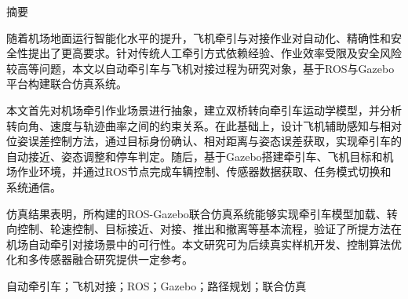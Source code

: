 
\begin{center}
{\heiti{} 摘\quad 要}
\end{center}

随着机场地面运行智能化水平的提升，飞机牵引与对接作业对自动化、精确性和安全性提出了更高要求。针对传统人工牵引方式依赖经验、作业效率受限及安全风险较高等问题，本文以自动牵引车与飞机对接过程为研究对象，基于ROS与Gazebo平台构建联合仿真系统。

本文首先对机场牵引作业场景进行抽象，建立双桥转向牵引车运动学模型，并分析转向角、速度与轨迹曲率之间的约束关系。在此基础上，设计飞机辅助感知与相对位姿误差控制方法，通过目标身份确认、相对距离与姿态误差获取，实现牵引车的自动接近、姿态调整和停车判定。随后，基于Gazebo搭建牵引车、飞机目标和机场作业环境，并通过ROS节点完成车辆控制、传感器数据获取、任务模式切换和系统通信。

仿真结果表明，所构建的ROS-Gazebo联合仿真系统能够实现牵引车模型加载、转向控制、轮速控制、目标接近、对接、推出和撤离等基本流程，验证了所提方法在机场自动牵引对接场景中的可行性。本文研究可为后续真实样机开发、控制算法优化和多传感器融合研究提供一定参考。

\vspace{1em}
 自动牵引车；飞机对接；ROS；Gazebo；路径规划；联合仿真
